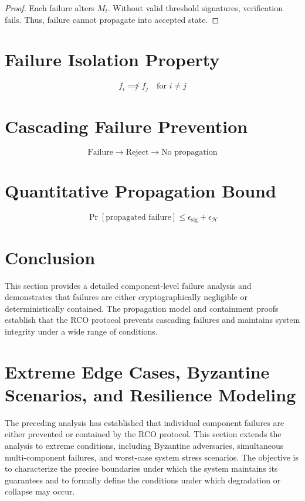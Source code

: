 \begin{proof}
Each failure alters $M_t$. Without valid threshold signatures, verification fails. Thus, failure cannot propagate into accepted state.
\end{proof}

\section{Failure Isolation Property}

\begin{equation}
f_i \not\implies f_j \quad \text{for } i \neq j
\end{equation}

\section{Cascading Failure Prevention}

\begin{equation}
\text{Failure} \rightarrow \text{Reject} \rightarrow \text{No propagation}
\end{equation}

\section{Quantitative Propagation Bound}

\begin{equation}
\Pr[\text{propagated failure}] \leq \epsilon_{\text{sig}} + \epsilon_{\mathcal{H}}
\end{equation}

\section{Conclusion}

This section provides a detailed component-level failure analysis and demonstrates that failures are either cryptographically negligible or deterministically contained. The propagation model and containment proofs establish that the RCO protocol prevents cascading failures and maintains system integrity under a wide range of conditions.

\section{Extreme Edge Cases, Byzantine Scenarios, and Resilience Modeling}

The preceding analysis has established that individual component failures are either prevented or contained by the RCO protocol. This section extends the analysis to extreme conditions, including Byzantine adversaries, simultaneous multi-component failures, and worst-case system stress scenarios. The objective is to characterize the precise boundaries under which the system maintains its guarantees and to formally define the conditions under which degradation or collapse may occur.

